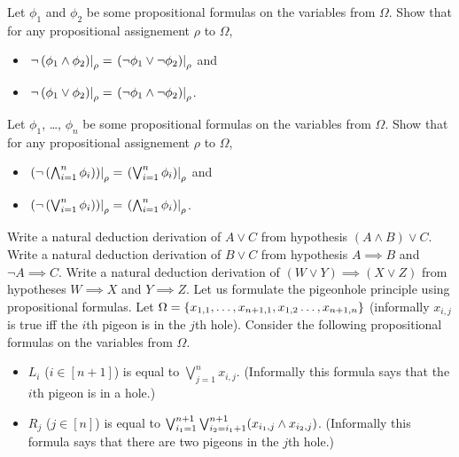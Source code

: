 \begin{chapterendexercises}
  \exercise %
    Let $\phi_1$ and $\phi_2$ be some propositional formulas on
    the variables from $\Omega$. Show that for any propositional assignement
    $\rho$ to $\Omega$,
    \begin{itemize}
      \item
        $\left. {
        \lnot\left(
          \phi_1 \land \phi_2
        \right)} \right\rvert_{\rho} =
        \left. {
          \left(
            \lnot \phi_1 \lor \lnot \phi_2
          \right)
         } \right\rvert_{\rho}$ and
    \item
    $\left. {
    \lnot\left(
      \phi_1 \lor \phi_2
    \right)} \right\rvert_{\rho} =
    \left. {
      \left(
        \lnot \phi_1 \land \lnot \phi_2
      \right)
     } \right\rvert_{\rho}$.
  \end{itemize}
  \exercise %
    Let $\phi_1$, \dots, $\phi_n$ be some propositional formulas on
    the variables from $\Omega$. Show that for any propositional assignement
    $\rho$ to $\Omega$,
    \begin{itemize}
      \item
        $\left. {
          \left(
            \lnot \left(
                    \bigwedge_{i = 1}^n \phi_i
                  \right)
          \right)} \right\rvert_{\rho} =
          \left. {
            \left(
              \bigvee_{i = 1}^n \phi_i
            \right)
           } \right\rvert_{\rho}$ and
      \item
        $\left. {
         \left(
           \lnot \left(
                   \bigvee_{i = 1}^n \phi_i
                 \right)
         \right)} \right\rvert_{\rho} =
         \left. {
           \left(
             \bigwedge_{i = 1}^n \phi_i
           \right)
          } \right\rvert_{\rho}$.
    \end{itemize}
  \exercise  Write a natural deduction derivation of $A \lor C$ from
    hypothesis $(A \land B) \lor C$.
  \exercise Write a natural deduction derivation of $B \lor C$ from
    hypothesis $A \implies B$ and $\lnot A \implies C$.
  \exercise Write a natural deduction derivation of
    $(W \lor Y) \implies (X \lor Z)$ from
    hypotheses $W \implies X$ and $Y \implies Z$.
  \exercise Let us formulate the pigeonhole principle using propositional
    formulas. Let
    $\Omega = \set{x_{1, 1}, \dots, x_{n + 1, 1}, x_{1, 2} \dots, x_{n + 1, n}}$
    (informally $x_{i, j}$ is true iff the $i$th pigeon is in the $j$th hole).
    Consider the following propositional formulas on the variables from
    $\Omega$.
    \begin{itemize}
      \item $L_i$ ($i \in [n + 1]$) is equal to $\bigvee_{j = 1}^n x_{i, j}$.
        (Informally this formula says that the $i$th pigeon is in a hole.)
      \item $R_j$ ($j \in [n]$) is equal to
        $\bigvee_{i_1 = 1}^{n + 1} \bigvee_{i_2 = i_1 + 1}^{n + 1}
        (x_{i_1, j} \land x_{i_2, j})$.
        (Informally this formula says that there are two pigeons in the $j$th
        hole.)
      \end{itemize}


\end{chapterendexercises}
